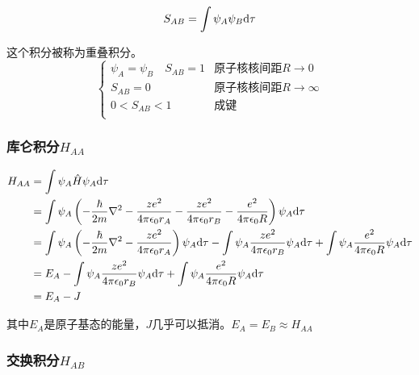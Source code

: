 \begin{equation*}
    S_{AB} = \int \psi_A \psi_B \mathrm{d} \tau
\end{equation*}

这个积分被称为重叠积分。
\begin{equation*}
    \begin{cases}
        \psi_A = \psi_B \quad S_{AB} = 1 & \mbox{原子核核间距} R \to 0      \\
        S_{AB} = 0                       & \mbox{原子核核间距} R \to \infty \\
        0 < S_{AB} < 1                   & \mbox{成键}                      \\
    \end{cases}
\end{equation*}

\subsubsection{库仑积分$H_{AA}$}

\begin{align*}
    H_{AA} & = \int \psi_A \hat{H} \psi_A \mathrm{d} \tau                                                                                                                                                                                           \\
           & = \int \psi_A \left( -\frac{\hbar}{2m} \nabla^2 - \frac{ze^2}{4\pi\epsilon_0r_A} - \frac{ze^2}{4\pi\epsilon_0r_B} -  \frac{e^2}{4\pi\epsilon_0R}  \right) \psi_A \mathrm{d} \tau                                                       \\
           & = \int \psi_A \left( -\frac{\hbar}{2m} \nabla^2 - \frac{ze^2}{4\pi\epsilon_0r_A} \right) \psi_A \mathrm{d} \tau  - \int \psi_A \frac{ze^2}{4\pi\epsilon_0r_B} \psi_A \mathrm{d} \tau + \int \psi_A  \frac{e^2}{4\pi\epsilon_0R} \psi_A \mathrm{d} \tau \\
           & = E_A - \int \psi_A \frac{ze^2}{4\pi\epsilon_0r_B} \psi_A \mathrm{d} \tau + \int \psi_A  \frac{e^2}{4\pi\epsilon_0R} \psi_A \mathrm{d} \tau                                                                                                    \\
           & = E_A - J
\end{align*}

其中$E_A$是原子基态的能量，$J$几乎可以抵消。$E_A = E_B \approx H_{AA}$

\subsubsection{交换积分$H_{AB}$}

